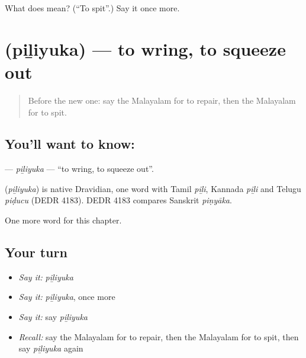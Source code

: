 \begin{tcolorbox}[breakable,colback=teal!4,colframe=teal!35!black,title={Before you move on}]
What does  mean? (\textquotedblleft{}To spit\textquotedblright{}.) Say it once more.
\end{tcolorbox}
\section[\texorpdfstring{\ml{പിഴിയുക} (piḻiyuka)}{പിഴിയുക (piḻiyuka)}]{ (piḻiyuka) — to wring, to squeeze out}

\label{lesson:ML-C189-piliyuka}



\begin{quote}
Before the new one: say the Malayalam for to repair, then the Malayalam for to spit.
\end{quote}

\subsection*{You'll want to know: }
\textbf{} — \emph{piḻiyuka} — \textquotedblleft{}to wring, to squeeze out\textquotedblright{}.

\begin{cousinweb}
\textbf{} (\emph{piḻiyuka}) is native Dravidian, one word with Tamil \emph{piḻi}, Kannada \emph{piḻi} and Telugu \emph{piḍucu} (DEDR 4183). DEDR 4183 compares Sanskrit \emph{piṇyāka}.
\end{cousinweb}

\begin{grammarlens}[title={What you've built}]
One more word for this chapter.
\end{grammarlens}

\subsection*{Your turn}
\begin{itemize}
\raggedright
  \item \emph{Say it:} \emph{piḻiyuka}
  \item \emph{Say it:} \emph{piḻiyuka}, once more
  \item \emph{Say it:} say \emph{piḻiyuka}
  \item \emph{Recall:} say the Malayalam for to repair, then the Malayalam for to spit, then say \emph{piḻiyuka} again
\end{itemize}

